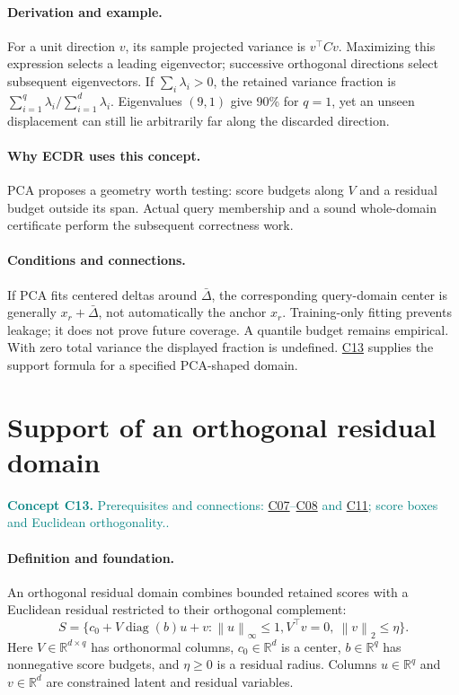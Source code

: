 \documentclass[11pt,a4paper]{article}
\newcommand{\R}{\mathbb R}
\newcommand{\norm}[1]{\left\lVert#1\right\rVert}
\newcommand{\diag}{\operatorname{diag}}
\newcommand{\conceptid}{Front matter}
\newcommand{\concept}[3]{\clearpage\renewcommand{\conceptid}{#1}%
\section{#2}\label{concept:#1}%
\textcolor{teal}{\textbf{Concept #1.} Prerequisites and connections: #3.}\par
\typeout{ECDR-CONCEPT-START #1 PAGE=\thepage}}
\begin{document}
\paragraph{Derivation and example.}
For a unit direction $v$, its sample projected variance is $v^\top Cv$. Maximizing this expression selects a leading eigenvector; successive orthogonal directions select subsequent eigenvectors. If $\sum_i\lambda_i>0$, the retained variance fraction is $\sum_{i=1}^{q}\lambda_i/\sum_{i=1}^{d}\lambda_i$. Eigenvalues $(9,1)$ give 90\% for $q=1$, yet an unseen displacement can still lie arbitrarily far along the discarded direction.
\paragraph{Why ECDR uses this concept.}
PCA proposes a geometry worth testing: score budgets along $V$ and a residual budget outside its span. Actual query membership and a sound whole-domain certificate perform the subsequent correctness work.
\paragraph{Conditions and connections.}
If PCA fits centered deltas around $\bar\Delta$, the corresponding query-domain center is generally $x_r+\bar\Delta$, not automatically the anchor $x_r$. Training-only fitting prevents leakage; it does not prove future coverage. A quantile budget remains empirical. With zero total variance the displayed fraction is undefined. \hyperref[concept:C13]{C13} supplies the support formula for a specified PCA-shaped domain.
\par\label{endconcept:C12}

\concept{C13}{Support of an orthogonal residual domain}{\hyperref[concept:C07]{C07}--\hyperref[concept:C08]{C08} and \hyperref[concept:C11]{C11}; score boxes and Euclidean orthogonality.}
\paragraph{Definition and foundation.}
An orthogonal residual domain combines bounded retained scores with a Euclidean residual restricted to their orthogonal complement:
\[
 S=\{c_0+V\diag(b)u+v:\norm{u}_\infty\le1,
          V^\top v=0,\ \norm{v}_2\le\eta\}.
\]
Here $V\in\R^{d\times q}$ has orthonormal columns, $c_0\in\R^d$ is a center, $b\in\R^q$ has nonnegative score budgets, and $\eta\ge0$ is a residual radius. Columns $u\in\R^q$ and $v\in\R^d$ are constrained latent and residual variables.
\end{document}
